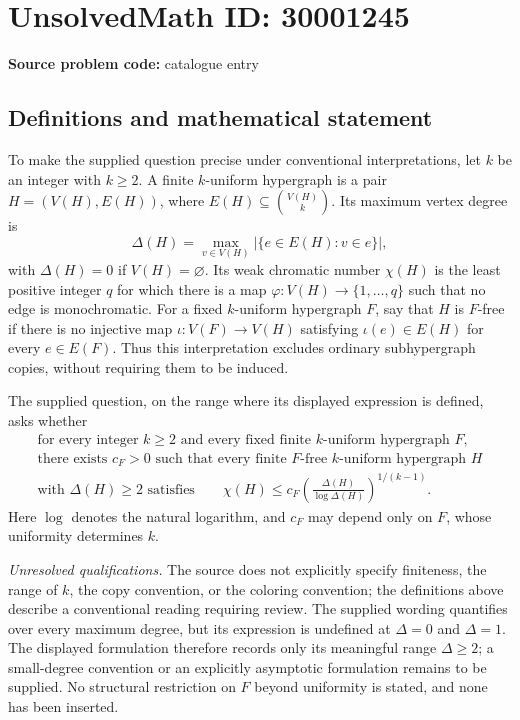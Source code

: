 \documentclass[11pt]{article}
\begin{document}
\section*{UnsolvedMath ID: 30001245}
\textbf{Source problem code:} catalogue entry
\subsection{Definitions and mathematical statement}
To make the supplied question precise under conventional interpretations, let \(k\) be an integer with \(k\ge 2\). A finite \(k\)-uniform hypergraph is a pair \(H=(V(H),E(H))\), where \(E(H)\subseteq\binom{V(H)}{k}\). Its maximum vertex degree is
\[
\Delta(H)=\max_{v\in V(H)}\bigl|\{e\in E(H):v\in e\}\bigr|,
\]
with \(\Delta(H)=0\) if \(V(H)=\varnothing\). Its weak chromatic number \(\chi(H)\) is the least positive integer \(q\) for which there is a map \(\varphi:V(H)\to\{1,\ldots,q\}\) such that no edge is monochromatic. For a fixed \(k\)-uniform hypergraph \(F\), say that \(H\) is \(F\)-free if there is no injective map \(\iota:V(F)\to V(H)\) satisfying \(\iota(e)\in E(H)\) for every \(e\in E(F)\). Thus this interpretation excludes ordinary subhypergraph copies, without requiring them to be induced.

The supplied question, on the range where its displayed expression is defined, asks whether
\[
\begin{gathered}
\text{for every integer }k\ge2\text{ and every fixed finite }k\text{-uniform hypergraph }F,\\
\text{there exists }c_F>0\text{ such that every finite }F\text{-free }k\text{-uniform hypergraph }H\\
\text{with }\Delta(H)\ge2\text{ satisfies}\qquad
\chi(H)\le c_F\left(\frac{\Delta(H)}{\log\Delta(H)}\right)^{1/(k-1)}.
\end{gathered}
\]
Here \(\log\) denotes the natural logarithm, and \(c_F\) may depend only on \(F\), whose uniformity determines \(k\).

\textit{Unresolved qualifications.} The source does not explicitly specify finiteness, the range of \(k\), the copy convention, or the coloring convention; the definitions above describe a conventional reading requiring review. The supplied wording quantifies over every maximum degree, but its expression is undefined at \(\Delta=0\) and \(\Delta=1\). The displayed formulation therefore records only its meaningful range \(\Delta\ge2\); a small-degree convention or an explicitly asymptotic formulation remains to be supplied. No structural restriction on \(F\) beyond uniformity is stated, and none has been inserted.
\end{document}
